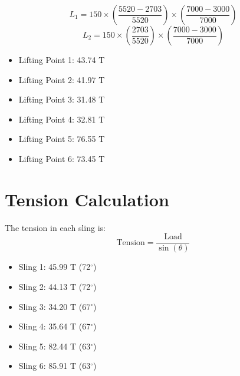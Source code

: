\documentclass[12pt]{article}
\begin{document}
\[ L_1 = 150 \times \left( \frac{5520-2703}{5520} \right) \times \left( \frac{7000-3000}{7000} \right) \]
\[ L_2 = 150 \times \left( \frac{2703}{5520} \right) \times \left( \frac{7000-3000}{7000} \right)\]


\begin{itemize}
  \item Lifting Point 1: 43.74 T
  \item Lifting Point 2: 41.97 T
  \item Lifting Point 3: 31.48 T
  \item Lifting Point 4: 32.81 T
  \item Lifting Point 5: 76.55 T
  \item Lifting Point 6: 73.45 T
\end{itemize}

\section{Tension Calculation}
The tension in each sling is:
\[
\text{Tension} = \frac{\text{Load}}{\sin(\theta)}
\]
\begin{itemize}
  \item Sling 1: 45.99 T (72$^\circ$)
  \item Sling 2: 44.13 T (72$^\circ$)
  \item Sling 3: 34.20 T (67$^\circ$)
  \item Sling 4: 35.64 T (67$^\circ$)
  \item Sling 5: 82.44 T (63$^\circ$)
  \item Sling 6: 85.91 T (63$^\circ$)
\end{itemize}
\end{document}
